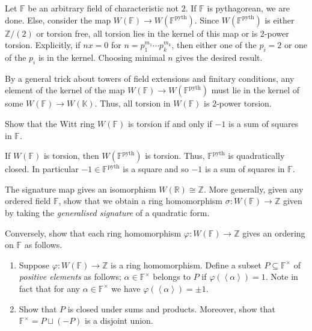 \documentclass[12 pt, letterpaper]{hmcpset}
\begin{document}
\begin{solution}
\begin{enumerate}
 Let $\mathbb{F}$ be an arbitrary field of characteristic not $2$. If $\mathbb{F}$ is pythagorean, we are done. Else, consider the map $W(\mathbb{F}) \to W(\mathbb{F}^{\text{pyth}})$. Since $W(\mathbb{F}^{\text{pyth}})$ is either $\mathbb{Z} / (2)$ or torsion free, all torsion lies in the kernel of this map or is $2$-power torsion. Explicitly, if $n x = 0$ for $n = p_{1}^{m_{1}} \cdots p_{k}^{m_{k}}$, then either one of the $p_{i} = 2$ or one of the $p_{i}$ is in the kernel. Choosing minimal $n$ gives the desired result.

			By a general trick about towers of field extensions and finitary conditions, any element of the kernel of the map $W(\mathbb{F}) \to W(\mathbb{F}^{\text{pyth}})$ must lie in the kernel of some $W(\mathbb{F}) \to W(\mathbb{K})$. Thus, all torsion in $W(\mathbb{F})$ is $2$-power torsion.
	\end{enumerate}
\end{solution}

\pagebreak

\begin{problem}[(3)]
	Show that the Witt ring $W(\mathbb{F})$ is torsion if and only if $-1$ is a sum of squares in $\mathbb{F}$.
\end{problem}

\begin{solution}
	If $W(\mathbb{F})$ is torsion, then $W(\mathbb{F}^{\text{pyth}})$ is torsion. Thus, $\mathbb{F}^{\text{pyth}}$ is quadratically closed. In particular $-1 \in \mathbb{F}^{\text{pyth}}$ is a square and so $-1$ is a sum of squares in $\mathbb{F}$.
\end{solution}

\pagebreak

\begin{problem}[(4)]
	The signature map gives an isomorphism $W(\mathbb{R}) \cong \mathbb{Z}$. More generally, given any ordered field $\mathbb{F}$, show that we obtain a ring homomorphism $\sigma : W(\mathbb{F}) \to \mathbb{Z}$ given by taking the \emph{generalised signature} of a quadratic form.

	Conversely, show that each ring homomorphism $\varphi : W(\mathbb{F}) \to \mathbb{Z}$ gives an ordering on $\mathbb{F}$ as follows.

	\begin{enumerate}
		\item Suppose $\varphi : W(\mathbb{F}) \to \mathbb{Z}$ is a ring homomorphism. Define a subset $P \subseteq \mathbb{F}^{\times}$ of \emph{positive elements} as follows;  $\alpha \in \mathbb{F}^{\times}$ belongs to $P$ if $\varphi(\left < \alpha \right >) = 1$. Note in fact that for any $\alpha \in \mathbb{F}^{\times}$ we have $\varphi(\left < \alpha \right >) = \pm 1$.

		\item Show that $P$ is closed under sums and products. Moreover, show that $\mathbb{F}^{\times} = P \sqcup (-P)$ is a disjoint union.
	\end{enumerate}
\end{problem}
\end{document}
